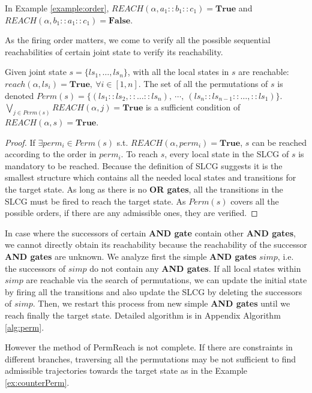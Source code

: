 In Example \ref{example:order}, $REACH(\alpha,a_1::b_1::c_1)=\mathbf{True}$ and $REACH(\alpha,b_1::a_1::c_1)=\mathbf{False}$.


As the firing order matters, we come to verify all the possible sequential reachabilities of certain joint state to verify its reachability.

\begin{proposition}\label{theoperm}
Given joint state $s=\{ls_1,\ldots,ls_n\}$, with all the local states in $s$ are reachable: $reach(\alpha,ls_i)=\mathbf{True},\ \forall i\in[1,n]$.
The set of all the permutations of $s$ is denoted $Perm(s)=\{(ls_1::ls_2,::\ldots ::ls_n),\ \cdots,\ (ls_n::ls_{n-1}::\ldots,::ls_1)\}$.
$\bigvee_{j\in Perm(s)} REACH(\alpha,j)=\mathbf{True}$ is a sufficient condition of $REACH(\alpha,s)=\mathbf{True}$.
\end{proposition}

\begin{proof}
If $\exists perm_i\in Perm(s)$ s.t. $REACH(\alpha,perm_i)=\mathbf{True}$, $s$ can be reached according to the order in $perm_i$.
To reach $s$, every local state in the SLCG of $s$ is mandatory to be reached. 
Because the definition of SLCG suggests it is the smallest structure which contains all the needed local states and transitions for the target state.
As long as there is no \textbf{OR gates}, all the transitions in the SLCG must be fired to reach the target state.
As $Perm(s)$ covers all the possible orders, if there are any admissible ones, they are verified.
\end{proof}

In case where the successors of certain \textbf{AND gate} contain other \textbf{AND gates}, we cannot directly obtain its reachability because the reachability of the successor \textbf{AND gates} are unknown.
We analyze first the simple \textbf{AND gates} $simp$, i.e. the successors of $simp$ do not contain any \textbf{AND gates}.
If all local states within $simp$ are reachable via the search of permutations, we can update the initial state by firing all the transitions and also update the SLCG by deleting the successors of $simp$. 
Then, we restart this process from new simple \textbf{AND gates} until we reach finally the target state.
Detailed algorithm is in Appendix Algorithm \ref{alg:perm}.

However the method of PermReach is not complete. 
If there are constraints in different branches, traversing all the permutations may be not sufficient to find admissible trajectories towards the target state as in the Example \ref{ex:counterPerm}.

